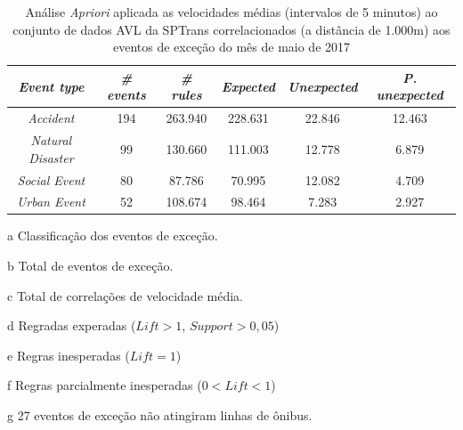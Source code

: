 \documentclass[
	12pt,				%
	oneside,			%
	a4paper,			%
	english,			%
	brazil				%
	]{abntex2ppgsi}
\begin{document}
\begin{apendicesenv}
\begin{table}[!htb]
\centering
\begin{threeparttable}
\caption {Análise \textit{Apriori} aplicada as velocidades médias (intervalos de 5 minutos) ao conjunto de dados AVL da SPTrans correlacionados (a distância de 1.000m) aos eventos de exceção do mês de maio de 2017}
\label {tab:aprioriFull}
\begin{tabular}{c|c|c|c|c|c}
\hline
\textbf{\textit{Event type}}\tnote{a} & \textbf{\textit{\# events}}\tnote{b} & \textit{\textbf{\# rules}}\tnote{c} & \textbf{\textit{Expected}}\tnote{d} & \textbf{\textit{Unexpected}}\tnote{e} & \textbf{\textit{P. unexpected}}\tnote{f}   \\
\hline
\textit{Accident} & 194 & 263.940 & 228.631 & 22.846 & 12.463 \\
\textit{Natural Disaster} & 99 & 130.660 & 111.003 & 12.778 & 6.879 \\
\textit{Social Event} & 80 & 87.786 & 70.995 & 12.082 & 4.709 \\
\textit{Urban Event} & 52 & 108.674 & 98.464 & 7.283 & 2.927 \\
\hline
\end{tabular}
\begin{tablenotes}
            \item[a] Classificação dos eventos de exceção.
            \item[b] Total de eventos de exceção.
            \item[c] Total de correlações de velocidade média.
            \item[d] Regradas experadas ($Lift > 1$, $Support > 0,05$)
            \item[e] Regras inesperadas ($Lift = 1$)
            \item[f] Regras parcialmente inesperadas ($0 < Lift < 1$)
            \item[g] 27 eventos de exceção não atingiram linhas de ônibus.
        \end{tablenotes}
\end{threeparttable}
\end{table}


\end{apendicesenv}
\end{document}
